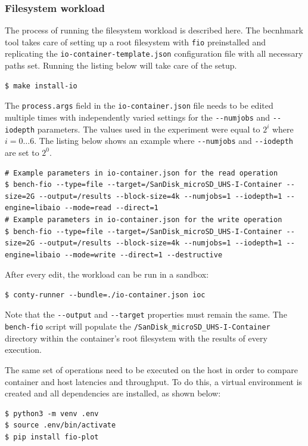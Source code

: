 \subsubsection{Filesystem workload}
The process of running the filesystem workload is described here. The becnhmark tool 
takes care of setting up a root filesystem with \verb|fio| preinstalled and replicating the 
\verb|io-container-template.json| configuration file with all necessary paths set.
Running the listing below will take care of the setup.
\begin{lstlisting}[label={code:implementation/benchmark/io-install}, style=bash, caption={}]
$ make install-io
\end{lstlisting}
The \verb|process.args| field in the \verb|io-container.json| file needs to be edited multiple times 
with independently varied settings for the \verb|--numjobs| and \verb|--iodepth| parameters. 
The values used in the experiment were equal to $2^{i}$ where $i = 0 \hdots 6$.
The listing below shows an example where \verb|--numjobs| and \verb|--iodepth| are set to $2^{0}$.
\begin{lstlisting}[label={code:implementation/benchmark/io-run}, style=bash, caption={}]
# Example parameters in io-container.json for the read operation
$ bench-fio --type=file --target=/SanDisk_microSD_UHS-I-Container --size=2G --output=/results --block-size=4k --numjobs=1 --iodepth=1 --engine=libaio --mode=read --direct=1 
# Example parameters in io-container.json for the write operation
$ bench-fio --type=file --target=/SanDisk_microSD_UHS-I-Container --size=2G --output=/results --block-size=4k --numjobs=1 --iodepth=1 --engine=libaio --mode=write --direct=1 --destructive 
\end{lstlisting}
After every edit, the workload can be run in a sandbox:
\begin{lstlisting}[label={code:implementation/benchmark/io-run-container}, style=bash, caption={}]
$ conty-runner --bundle=./io-container.json ioc
\end{lstlisting}
Note that the \verb|--output| and \verb|--target| properties must remain the same. 
The \verb|bench-fio| script will populate the \verb|/SanDisk_microSD_UHS-I-Container| directory within the container's 
root filesystem with the results of every execution.

The same set of operations need to be executed on the host in order to compare container and host 
latencies and throughput. To do this, a virtual environment is created and all dependencies 
are installed, as shown below:
\begin{lstlisting}[label={code:implementation/benchmark/io-prep}, style=bash, caption={}]
$ python3 -m venv .env 
$ source .env/bin/activate
$ pip install fio-plot
\end{lstlisting}

